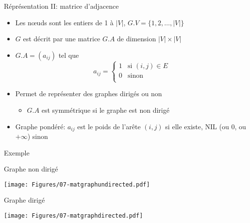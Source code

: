 \begin{frame}{Réprésentation II: matrice d'adjacence}
\begin{itemize}
\item Les n\oe uds sont les entiers de 1 à $|V|$, $G.V=\{1,2,\ldots,|V|\}$
\item $G$ est décrit par une matrice $G.A$ de dimension $|V|\times |V|$ 
\item $G.A=(a_{ij})$ tel que
\[
a_{ij}=\left\{\begin{array}{ll}
1 & \mbox{si }(i,j)\in E\\
0 & \mbox{sinon}\\
\end{array}\right.
\]
\bigskip

\item Permet de représenter des graphes dirigés ou non
\begin{itemize}
\item $G.A$ est symmétrique si le graphe est non dirigé
\end{itemize}
\item Graphe pondéré: $a_{ij}$ est le poids de l'arête $(i,j)$ si elle existe, NIL (ou 0, ou $+\infty$) sinon
\end{itemize}
\end{frame}

\begin{frame}{Exemple}

Graphe non dirigé
\centerline{\texttt{[image: Figures/07-matgraphundirected.pdf]}}

\bigskip

Graphe dirigé
\centerline{\texttt{[image: Figures/07-matgraphdirected.pdf]}}

\end{frame}

